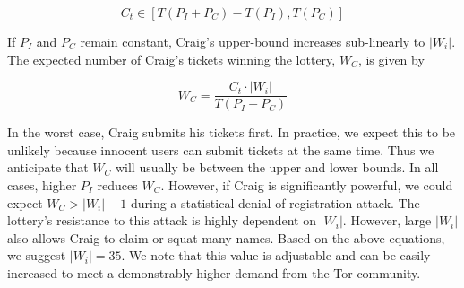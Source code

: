 \documentclass[USenglish,oneside,twocolumn]{article}
\newcommand*\nWinners{\left\vert{W_{i}}\right\vert}
\begin{document}
\begin{equation}
	C_{t} \in {[ T(P_{I} + P_{C}) - T(P_{I}), T(P_{C})  ]}
\end{equation}

If $ P_{I} $ and $ P_{C} $ remain constant, Craig's upper-bound increases sub-linearly to $ \nWinners $. The expected number of Craig's tickets winning the lottery, $ W_{C} $, is given by

\begin{equation}
	W_{C} = \frac{C_{t} \cdot \nWinners}{T(P_{I} + P_{C})}
\end{equation}

In the worst case, Craig submits his tickets first. In practice, we expect this to be unlikely because innocent users can submit tickets at the same time. Thus we anticipate that $ W_{C} $ will usually be between the upper and lower bounds. In all cases, higher $ P_{I} $ reduces $ W_{C} $. However, if Craig is significantly powerful, we could expect $ W_{C} > \nWinners - 1 $ during a statistical denial-of-registration attack. The lottery's resistance to this attack is highly dependent on $ \nWinners $. However, large $ \nWinners $ also allows Craig to claim or squat many names. Based on the above equations, we suggest $ \nWinners = 35 $. We note that this value is adjustable and can be easily increased to meet a demonstrably higher demand from the Tor community.

\end{document}
